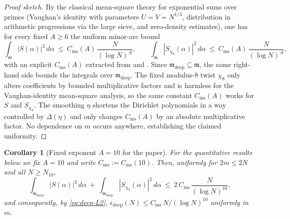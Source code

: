 \documentclass[11pt]{article}
\newtheorem{corollary}[theorem]{Corollary}
\theoremstyle{definition}
\theoremstyle{remark}
\begin{document}
\begin{proof}[Proof sketch]
By the classical mean-square theory for exponential sums over primes (Vaughan's identity with parameters $U=V=N^{1/3}$, distribution in arithmetic progressions via the large sieve, and zero-density estimates), one has for every fixed $A\ge 6$ the uniform minor-arc bound
\[
  \int_{\mathfrak m}\!|S(\alpha)|^2\,d\alpha\ \le\ C_{\mathrm{ms}}(A)\,\frac{N}{(\log N)^A},\qquad
  \int_{\mathfrak m}\!|S_{\chi_8}(\alpha)|^2\,d\alpha\ \le\ C_{\mathrm{ms}}(A)\,\frac{N}{(\log N)^A},
\]
with an explicit $C_{\mathrm{ms}}(A)$ extracted from \cite[Ch.~13]{MontgomeryVaughan2007} and \cite[Ch.~3]{Vaughan1997}. Since $\mathfrak m_{\mathrm{deep}}\subseteq \mathfrak m$, the same right-hand side bounds the integrals over $\mathfrak m_{\mathrm{deep}}$. The fixed modulus-$8$ twist $\chi_8$ only alters coefficients by bounded multiplicative factors and is harmless for the Vaughan-identity mean-square analysis, so the same constant $C_{\mathrm{ms}}(A)$ works for $S$ and $S_{\chi_8}$. The smoothing $\eta$ shortens the Dirichlet polynomials in a way controlled by $\Delta(\eta)$ and only changes $C_{\mathrm{ms}}(A)$ by an absolute multiplicative factor. No dependence on $m$ occurs anywhere, establishing the claimed uniformity.
\end{proof}

\begin{corollary}[Fixed exponent $A=10$ for the paper]\label{cor:deep-L2-A10}
For the quantitative results below we fix $A=10$ and write $C_{\mathrm{ms}}:=C_{\mathrm{ms}}(10)$. Then, uniformly for $2m\le 2N$ and all $N\ge N_{10}$,
\[
  \int_{\mathfrak m_{\mathrm{deep}}}\!|S(\alpha)|^2\,d\alpha\ +\ \int_{\mathfrak m_{\mathrm{deep}}}\!|S_{\chi_8}(\alpha)|^2\,d\alpha\ \le\ 2\,C_{\mathrm{ms}}\,\frac{N}{(\log N)^{10}},
\]
and consequently, by \eqref{eq:deep-L2}, $\epsilon_{\mathrm{deep}}(N)\le C_{\mathrm{ms}}\,N/(\log N)^{10}$ uniformly in $m$.
\end{corollary}
\end{document}
